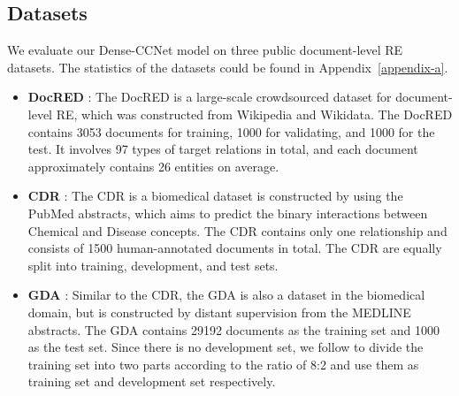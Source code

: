 \documentclass[11pt]{article}
\begin{document}
\subsection{Datasets}
We evaluate our Dense-CCNet model on three public document-level RE datasets. 
The statistics of the datasets could be found in Appendix~\ref{appendix-a}.
\begin{itemize}
\item \textbf{DocRED} \cite{c:104}:
The DocRED is a large-scale crowdsourced dataset for document-level RE, which was constructed from Wikipedia and Wikidata. 
The DocRED contains 3053 documents for training, 1000 for validating, and 1000 for the test. It involves 97 types of target relations in total, and each document approximately contains 26 entities on average. 
\item \textbf{CDR} \cite{c:122}:
The CDR is a biomedical dataset is constructed by using the PubMed abstracts, which aims to predict the binary interactions between Chemical and Disease concepts. The CDR contains only one relationship and consists of 1500 human-annotated documents in total. 
The CDR are equally split into training, development, and test sets.
\item \textbf{GDA} \cite{c:123}:
Similar to the CDR, the GDA is also a dataset in the biomedical domain, but is constructed by distant supervision from the MEDLINE abstracts. 
The GDA contains 29192 documents as the training set and 1000 as the test set. Since there is no development set, we follow \cite{c:107} to divide the training set into two parts according to the ratio of 8:2 and use them as training set and development set respectively.
\end{itemize}
\end{document}
